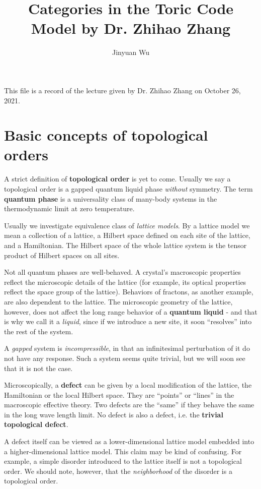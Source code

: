 \documentclass[hyperref, a4paper]{article}
\title{Categories in the Toric Code Model by Dr. Zhihao Zhang}
\author{Jinyuan Wu}
\newcommand*{\concept}[1]{{\textbf{#1}}}
\begin{document}
\maketitle

This file is a record of the lecture given by Dr. Zhihao Zhang on October 26, 2021.

\section{Basic concepts of topological orders}

A strict definition of \concept{topological order} is yet to come. Usually we say a topological order is a gapped quantum liquid phase \emph{without} symmetry.
The term \concept{quantum phase} is a universality class of many-body systems in the thermodynamic limit at zero temperature.

Usually we investigate equivalence class of \emph{lattice models}. By a lattice model we mean a collection of a lattice, a Hilbert space defined on each site of the lattice, and a Hamiltonian.
The Hilbert space of the whole lattice system is the tensor product of Hilbert spaces on all sites.

Not all quantum phases are well-behaved. A crystal's macroscopic properties reflect the microscopic details of the lattice (for example, its optical properties reflect the space group of the lattice).
Behaviors of fractons, as another example, are also dependent to the lattice.
The microscopic geometry of the lattice, however, does not affect the long range behavior of a \concept{quantum liquid} - and that is why we call it a \emph{liquid}, since if we introduce a new site, it soon ``resolves'' into the rest of the system.

A \emph{gapped} system is \emph{incompressible}, in that an infinitesimal perturbation of it do not have any response.
Such a system seems quite trivial, but we will soon see that it is not the case.

Microscopically, a \concept{defect} can be given by a local modification of the lattice, the Hamiltonian or the local Hilbert space. 
They are ``points'' or ``lines'' in the macroscopic effective theory.
Two defects are the ``same'' if they behave the same in the long wave length limit.
No defect is also a defect, i.e. the \concept{trivial topological defect}.

A defect itself can be viewed as a lower-dimensional lattice model embedded into a higher-dimensional lattice model. 
This claim may be kind of confusing. For example, a simple disorder introduced to the lattice itself is not a topological order.
We should note, however, that the \emph{neighborhood} of the disorder is a topological order.
\end{document}
